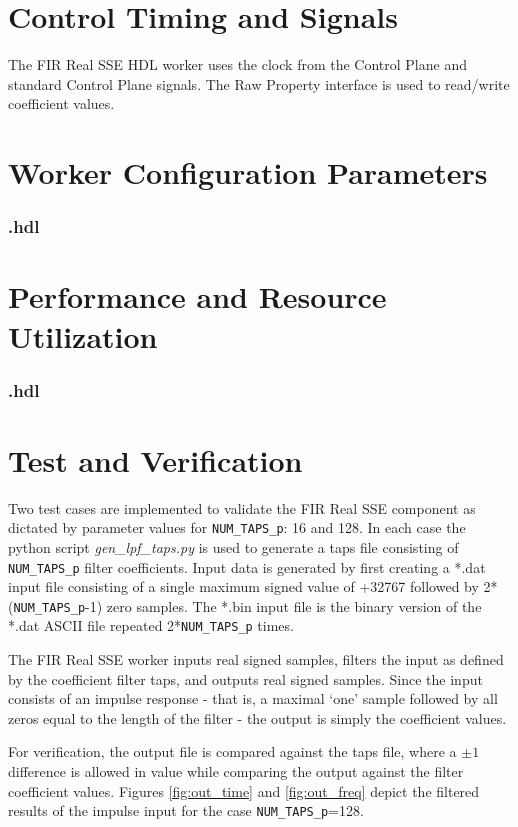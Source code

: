\section*{Control Timing and Signals}
\begin{flushleft}
	The FIR Real SSE HDL worker uses the clock from the Control Plane and standard Control Plane signals. The Raw Property interface is used to read/write coefficient values.
\end{flushleft}

\begin{landscape}
\section*{Worker Configuration Parameters}
\subsubsection*{\comp.hdl}
%
\section*{Performance and Resource Utilization}
\subsubsection*{\comp.hdl}
%
\end{landscape}
\section*{Test and Verification}

\begin{flushleft}
Two test cases are implemented to validate the FIR Real SSE component as dictated by parameter values for \verb+NUM_TAPS_p+: 16 and 128. In each case the python script \textit{gen\_lpf\_taps.py} is used to generate a taps file consisting of \verb+NUM_TAPS_p+ filter coefficients. Input data is generated by first creating a *.dat input file consisting of a single maximum signed value of +32767 followed by 2*(\verb+NUM_TAPS_p+-1) zero samples. The *.bin input file is the binary version of the *.dat ASCII file repeated 2*\verb+NUM_TAPS_p+ times.\medskip

The FIR Real SSE worker inputs real signed samples, filters the input as defined by the coefficient filter taps, and outputs real signed samples. Since the input consists of an impulse response - that is, a maximal `one' sample followed by all zeros equal to the length of the filter - the output is simply the coefficient values.\medskip

For verification, the output file is compared against the taps file, where a $\pm1$ difference is allowed in value while comparing the output against the filter coefficient values. Figures \ref{fig:out_time} and \ref{fig:out_freq} depict the filtered results of the impulse input for the case \verb+NUM_TAPS_p+=128.
\end{flushleft}


